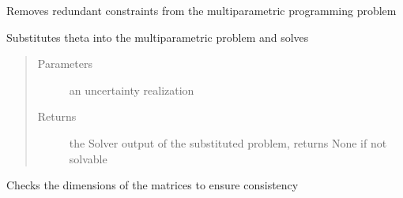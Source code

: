 \documentclass[letterpaper,10pt,english]{sphinxmanual}
\begin{document}
\begin{fulllineitems}
\begin{fulllineitems}
\label{\detokenize{mpo:mpo.mp_program.MPQP_Program.process_constraints}}
\sphinxAtStartPar
Removes redundant constraints from the multiparametric programming problem

\end{fulllineitems}


\begin{fulllineitems}
\label{\detokenize{mpo:mpo.mp_program.MPQP_Program.solve_theta}}
\sphinxAtStartPar
Substitutes theta into the multiparametric problem and solves
\begin{quote}\begin{description}
\item[{Parameters}] \leavevmode
\sphinxAtStartPar
{} \textendash{} an uncertainty realization

\item[{Returns}] \leavevmode
\sphinxAtStartPar
the Solver output of the substituted problem, returns None if not solvable

\end{description}\end{quote}

\end{fulllineitems}


\begin{fulllineitems}
\label{\detokenize{mpo:mpo.mp_program.MPQP_Program.warnings}}
\sphinxAtStartPar
Checks the dimensions of the matrices to ensure consistency

\end{fulllineitems}


\end{fulllineitems}
\end{document}
